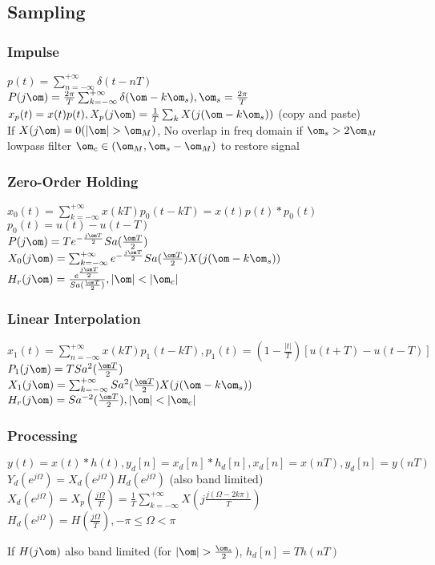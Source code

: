 \subsection{Sampling}
\subsubsection*{Impulse}
$p(t)=\sum_{n=-\infty}^{+\infty} \delta(t-nT)$\\
$P(j\om)=\frac{2\pi}{T}\sum_{k=-\infty}^{+\infty} \delta(\om-k\om_s), \om_s=\frac{2\pi}{T}$\\
$x_p(t)=x(t)p(t), X_p(j\om) = \frac{1}{T}\sum_k X(j(\om-k\om_s))$ (copy and paste)\\
If $X(j\om)=0(|\om|>\om_M)$, No overlap in freq domain if $\om_s>2\om_M$\\
lowpass filter $\om_c\in(\om_M,\om_s - \om_M)$ to restore signal
\subsubsection*{Zero-Order Holding}
$x_0(t)=\sum_{k=-\infty}^{+\infty} x(kT)p_0(t-kT)=x(t)p(t)*p_0(t)$\\
$ p_0(t)=u(t)-u(t-T)$\\
$P(j\om)=Te^{-\frac{j\om T}{2}} Sa(\frac{\om T}{2})$\\
$X_0(j\om)=\sum_{k=-\infty}^{+\infty} e^{-\frac{j\om T}{2}} Sa(\frac{\om T}{2}) X(j(\om-k\om_s))$\\
$H_{r}(j\om) =\frac{e^{\frac{j\om T}2}}{Sa(\frac{\om T}{2})}, |\om|<|\om_c|$\\
\subsubsection*{Linear Interpolation}
$x_1(t)=\sum_{n=-\infty}^{+\infty} x(kT)p_1(t-kT), p_1(t)=(1-\frac{|t|}{T})[u(t+T)-u(t-T)]$\\
$P_1(j\om)=TSa^2(\frac{\om T}{2})$\\
$X_1(j\om)=\sum_{k=-\infty}^{+\infty}Sa^2(\frac{\om T}{2})X(j(\om-k\om_s))$\\
$H_r(j\om)=Sa^{-2}(\frac{\om T}{2}), |\om|<|\om_c|$
\subsubsection*{Processing}
$y(t)=x(t)*h(t), y_d[n]=x_d[n]*h_d[n], x_d[n]=x(nT), y_d[n]=y(nT)$\\
$Y_d(e^{j\Omega})=X_d(e^{j\Omega})H_d(e^{j\Omega})$ (also band limited)\\
$X_d(e^{j\Omega})=X_p(\frac{j\Omega}{T})=\frac 1 T\sum_{k=-\infty}^{+\infty} X(j\frac{j(\Omega-2k\pi)}{T})$\\
$H_d(e^{j\Omega})=H(\frac{j\Omega}{T}), -\pi\le \Omega<\pi$

If $H(j\om)$ also band limited (for $|\om|>\frac{\om_s}{2}$), $h_d[n]=Th(nT)$